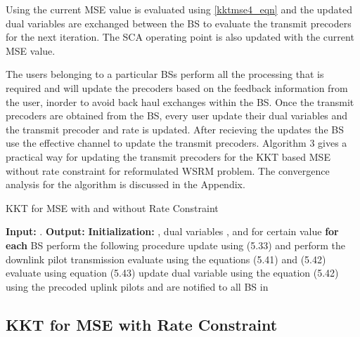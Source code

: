 Using the current \ac{MSE} value  is evaluated using \eqref{kktmse4_eqn} and the updated dual variables are exchanged between the \ac{BS} to evaluate the transmit precoders  for the next iteration. The \ac{SCA} operating point is also updated with the current \ac{MSE} value.

The users belonging to a particular \ac{BS}s perform all the processing that is required and will update the precoders based on the feedback information from the user, inorder to avoid back haul exchanges within the \ac{BS}. Once the transmit precoders are obtained from the \ac{BS}, every user update their dual variables  and the transmit precoder  and rate  is updated. After recieving the updates the \ac{BS} use the effective channel to update the transmit precoders. Algorithm 3 gives a practical way for updating the transmit precoders for the \ac{KKT} based MSE without rate constraint for reformulated \ac{WSRM} problem. The convergence analysis for the algorithm is discussed in the Appendix.

\begin{algorithm}[h]
	\caption[Distributed Precoder Design]{KKT for MSE with and without Rate Constraint}
	\label{algo-2}
	\begin{algorithmic}
		\label{algo--2}
		\STATE \textbf{Input:} .
		\STATE \textbf{Output:} 
		\STATE \textbf{Initialization:}  , dual variables	, and  for certain value
		\REPEAT
		\STATE \textbf{for each} \ac{BS}  perform the following procedure
		\STATE update  using (5.33) and perform the downlink pilot transmission
		\STATE evaluate  using the equations (5.41) and (5.42) 
		\STATE evaluate  using equation (5.43)
		\STATE update dual variable  using the equation (5.42)
		\ENDIF
		\STATE using the precoded uplink pilots  and  are notified to all \ac{BS} in 
		\\
	\end{algorithmic} 
\end{algorithm}

\subsection{KKT for MSE with Rate Constraint}

